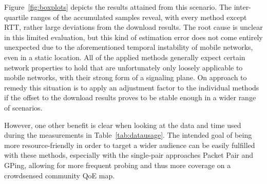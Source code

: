 Figure~\ref{fig:boxplots} depicts the results attained from this scenario. The inter-quartile ranges of the accumulated samples reveal, with every method except RTT, rather large deviations from the download results. The root cause is unclear in this limited evaluation, but this kind of estimation error does not come entirely unexpected due to the aforementioned temporal instability of mobile networks, even in a static location. All of the applied methods generally expect certain network properties to hold that are unfortunately only loosely applicable to mobile networks, with their strong form of a signaling plane. On approach to remedy this situation is to apply an adjustment factor to the individual methods if the offset to the download results proves to be stable enough in a wider range of scenarios.

However, one other benefit is clear when looking at the data and time used during the measurements in Table~\ref{tab:datausage}. The intended goal of being more resource-friendly in order to target a wider audience can be easily fulfilled with these methods, especially with the single-pair approaches Packet Pair and GPing, allowing for more frequent probing and thus more coverage on a crowdsensed community \gls{QoE} map.
